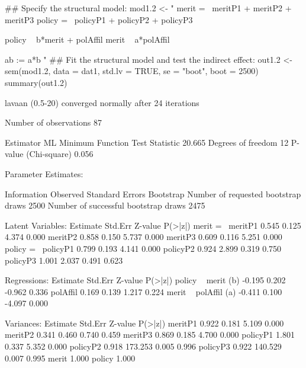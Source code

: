 \begin{Schunk}
\begin{Sinput}
 ## Specify the structural model:
 mod1.2 <- "
 merit =~ meritP1 + meritP2 + meritP3
 policy =~ policyP1 + policyP2 + policyP3
 
 policy ~ b*merit + polAffil
 merit ~ a*polAffil
 
 ab := a*b
 "
 ## Fit the structural model and test the indirect effect:
 out1.2 <- sem(mod1.2, data = dat1, std.lv = TRUE, 
               se = "boot", boot = 2500)
 summary(out1.2)
\end{Sinput}
\begin{Soutput}
lavaan (0.5-20) converged normally after  24 iterations

  Number of observations                            87

  Estimator                                         ML
  Minimum Function Test Statistic               20.665
  Degrees of freedom                                12
  P-value (Chi-square)                           0.056

Parameter Estimates:

  Information                                 Observed
  Standard Errors                            Bootstrap
  Number of requested bootstrap draws             2500
  Number of successful bootstrap draws            2475

Latent Variables:
                   Estimate  Std.Err  Z-value  P(>|z|)
  merit =~                                            
    meritP1           0.545    0.125    4.374    0.000
    meritP2           0.858    0.150    5.737    0.000
    meritP3           0.609    0.116    5.251    0.000
  policy =~                                           
    policyP1          0.799    0.193    4.141    0.000
    policyP2          0.924    2.899    0.319    0.750
    policyP3          1.001    2.037    0.491    0.623

Regressions:
                   Estimate  Std.Err  Z-value  P(>|z|)
  policy ~                                            
    merit      (b)   -0.195    0.202   -0.962    0.336
    polAffil          0.169    0.139    1.217    0.224
  merit ~                                             
    polAffil   (a)   -0.411    0.100   -4.097    0.000

Variances:
                   Estimate  Std.Err  Z-value  P(>|z|)
    meritP1           0.922    0.181    5.109    0.000
    meritP2           0.341    0.460    0.740    0.459
    meritP3           0.869    0.185    4.700    0.000
    policyP1          1.801    0.337    5.352    0.000
    policyP2          0.918  173.253    0.005    0.996
    policyP3          0.922  140.529    0.007    0.995
    merit             1.000                           
    policy            1.000                           


\end{Soutput}
\end{Schunk}
